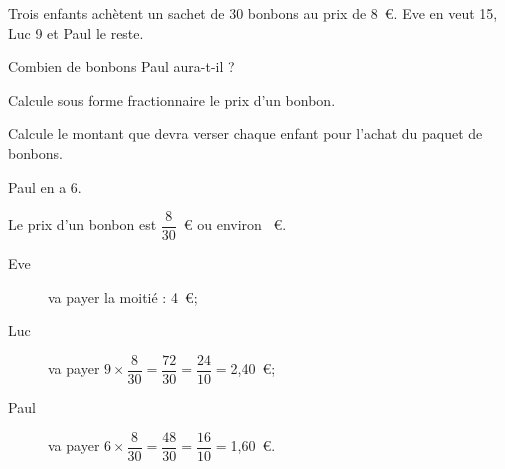 Trois enfants achètent un sachet de 30 bonbons au prix de 8~\textgreek{\euro}. Eve en veut 15, Luc 9 et Paul le reste.
\begin{myenumerate}
  \item Combien de bonbons Paul aura-t-il ?
  \item Calcule sous forme fractionnaire le prix d'un bonbon.
  \item Calcule le montant que devra verser chaque enfant pour l'achat du paquet de bonbons.
\end{myenumerate}
\begin{myenumerate}
  \item Paul en a 6.
  \item\subitem{}\par{}\hfill Le prix d'un bonbon est $\dfrac8{30}$~\textgreek{\euro} ou environ ~\textgreek{\euro}.
  \item 
    \begin{description}
      \item[Eve] va payer la moitié : 4~\textgreek{\euro};
      \item[Luc] va payer $9\times\dfrac8{30}=\dfrac{72}{30}=\dfrac{24}{10}=$2,40~\textgreek{\euro};
      \item[Paul] va payer $6\times\dfrac8{30}=\dfrac{48}{30}=\dfrac{16}{10}=$1,60~\textgreek{\euro}.
    \end{description}
\end{myenumerate}